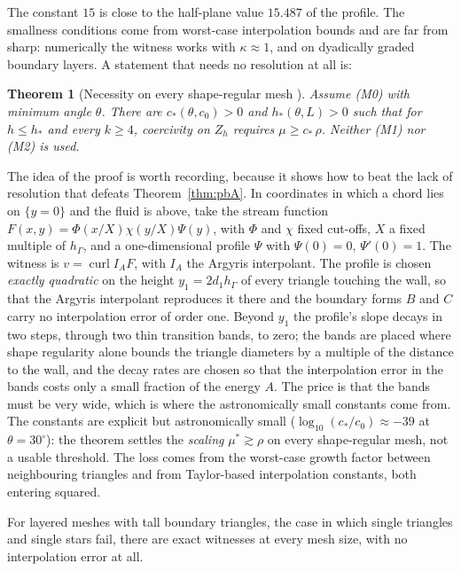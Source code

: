 \documentclass[pdflatex,sn-mathphys-num]{sn-jnl}
\theoremstyle{thmstyleone}
\newtheorem{theorem}{Theorem}[section]
\theoremstyle{thmstylethree}
\newcommand{\hG}{h_\Gamma}
\newcommand{\Zh}{Z_h}
\newcommand{\curl}{\operatorname{curl}}
\begin{document}
The constant $15$ is close to the half-plane value $15.487$ of the profile. The smallness conditions come from worst-case interpolation bounds and are far from sharp: numerically the witness works with $\kappa\approx1$, and on dyadically graded boundary layers. A statement that needs no resolution at all is:

\begin{theorem}[Necessity on every shape-regular mesh {\cite{PadhiExt}}]\label{thm:pbM0}
Assume (M0) with minimum angle $\theta$. There are $c_\ast(\theta,c_0)>0$ and $h_\ast(\theta,L)>0$ such that for $h\le h_\ast$ and every $k\ge4$, coercivity on $\Zh$ requires $\mu\ge c_\ast\,\rho$. Neither (M1) nor (M2) is used.
\end{theorem}

The idea of the proof is worth recording, because it shows how to beat the lack of resolution that defeats Theorem~\ref{thm:pbA}. In coordinates in which a chord lies on $\{y=0\}$ and the fluid is above, take the stream function $F(x,y)=\Phi(x/X)\chi(y/X)\Psi(y)$, with $\Phi$ and $\chi$ fixed cut-offs, $X$ a fixed multiple of $\hG$, and a one-dimensional profile $\Psi$ with $\Psi(0)=0$, $\Psi'(0)=1$. The witness is $v=\curl I_AF$, with $I_A$ the Argyris interpolant. The profile is chosen \emph{exactly quadratic} on the height $y_1=2d_1\hG$ of every triangle touching the wall, so that the Argyris interpolant reproduces it there and the boundary forms $B$ and $C$ carry no interpolation error of order one. Beyond $y_1$ the profile's slope decays in two steps, through two thin transition bands, to zero; the bands are placed where shape regularity alone bounds the triangle diameters by a multiple of the distance to the wall, and the decay rates are chosen so that the interpolation error in the bands costs only a small fraction of the energy $A$. The price is that the bands must be very wide, which is where the astronomically small constants come from. The constants are explicit but astronomically small ($\log_{10}(c_\ast/c_0)\approx-39$ at $\theta=30^\circ$): the theorem settles the \emph{scaling} $\mu^\ast\gtrsim\rho$ on every shape-regular mesh, not a usable threshold. The loss comes from the worst-case growth factor between neighbouring triangles and from Taylor-based interpolation constants, both entering squared.

For layered meshes with tall boundary triangles, the case in which single triangles and single stars fail, there are exact witnesses at every mesh size, with no interpolation error at all.
\end{document}
